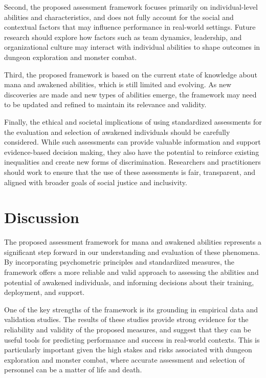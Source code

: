 \documentclass[12pt, a4paper]{article}
\begin{document}
Second, the proposed assessment framework focuses primarily on individual-level abilities and characteristics, and does not fully account for the social and contextual factors that may influence performance in real-world settings. Future research should explore how factors such as team dynamics, leadership, and organizational culture may interact with individual abilities to shape outcomes in dungeon exploration and monster combat.

Third, the proposed framework is based on the current state of knowledge about mana and awakened abilities, which is still limited and evolving. As new discoveries are made and new types of abilities emerge, the framework may need to be updated and refined to maintain its relevance and validity.

Finally, the ethical and societal implications of using standardized assessments for the evaluation and selection of awakened individuals should be carefully considered. While such assessments can provide valuable information and support evidence-based decision making, they also have the potential to reinforce existing inequalities and create new forms of discrimination. Researchers and practitioners should work to ensure that the use of these assessments is fair, transparent, and aligned with broader goals of social justice and inclusivity.

\section{Discussion}

The proposed assessment framework for mana and awakened abilities represents a significant step forward in our understanding and evaluation of these phenomena. By incorporating psychometric principles and standardized measures, the framework offers a more reliable and valid approach to assessing the abilities and potential of awakened individuals, and informing decisions about their training, deployment, and support.

One of the key strengths of the framework is its grounding in empirical data and validation studies. The results of these studies provide strong evidence for the reliability and validity of the proposed measures, and suggest that they can be useful tools for predicting performance and success in real-world contexts. This is particularly important given the high stakes and risks associated with dungeon exploration and monster combat, where accurate assessment and selection of personnel can be a matter of life and death.
\end{document}
